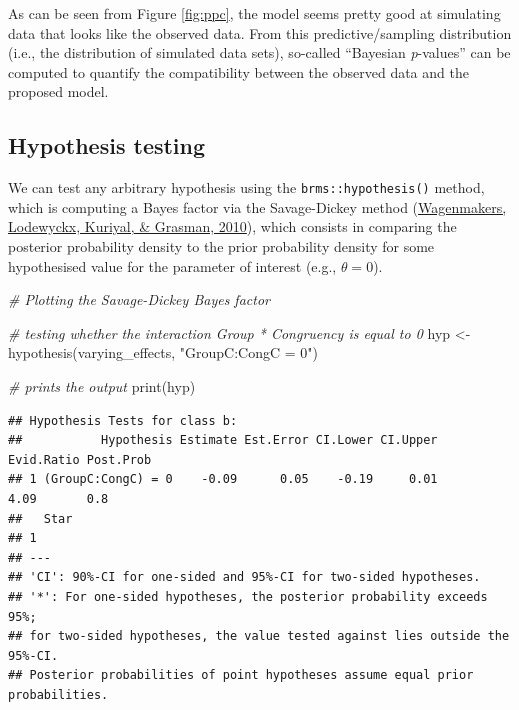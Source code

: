 \documentclass[
  11pt,
  english,
  ,doc,floatsintext]{apa6}
\newenvironment{Shaded}{}{}
\newcommand{\CommentTok}[1]{\textcolor[rgb]{0.38,0.63,0.69}{\textit{#1}}}
\newcommand{\FunctionTok}[1]{\textcolor[rgb]{0.02,0.16,0.49}{#1}}
\newcommand{\NormalTok}[1]{#1}
\newcommand{\OtherTok}[1]{\textcolor[rgb]{0.00,0.44,0.13}{#1}}
\newcommand{\StringTok}[1]{\textcolor[rgb]{0.25,0.44,0.63}{#1}}
\begin{document}
As can be seen from Figure \ref{fig:ppc}, the model seems pretty good at simulating data that looks like the observed data. From this predictive/sampling distribution (i.e., the distribution of simulated data sets), so-called ``Bayesian \emph{p}-values'' can be computed to quantify the compatibility between the observed data and the proposed model.

\newpage

\hypertarget{hypothesis-testing}{%
\subsection{Hypothesis testing}\label{hypothesis-testing}}

We can test any arbitrary hypothesis using the \texttt{brms::hypothesis()} method, which is computing a Bayes factor via the Savage-Dickey method (\protect\hyperlink{ref-wagenmakers_bayesian_2010}{Wagenmakers, Lodewyckx, Kuriyal, \& Grasman, 2010}), which consists in comparing the posterior probability density to the prior probability density for some hypothesised value for the parameter of interest (e.g., \(\theta = 0\)).

\begin{Shaded}
\begin{Highlighting}[]
\CommentTok{\# Plotting the Savage{-}Dickey Bayes factor}

\CommentTok{\# testing whether the interaction Group * Congruency is equal to 0}
\NormalTok{hyp }\OtherTok{\textless{}{-}} \FunctionTok{hypothesis}\NormalTok{(varying\_effects, }\StringTok{"GroupC:CongC = 0"}\NormalTok{)}

\CommentTok{\# prints the output}
\FunctionTok{print}\NormalTok{(hyp)}
\end{Highlighting}
\end{Shaded}

\begin{verbatim}
## Hypothesis Tests for class b:
##           Hypothesis Estimate Est.Error CI.Lower CI.Upper Evid.Ratio Post.Prob
## 1 (GroupC:CongC) = 0    -0.09      0.05    -0.19     0.01       4.09       0.8
##   Star
## 1     
## ---
## 'CI': 90%-CI for one-sided and 95%-CI for two-sided hypotheses.
## '*': For one-sided hypotheses, the posterior probability exceeds 95%;
## for two-sided hypotheses, the value tested against lies outside the 95%-CI.
## Posterior probabilities of point hypotheses assume equal prior probabilities.
\end{verbatim}
\end{document}
